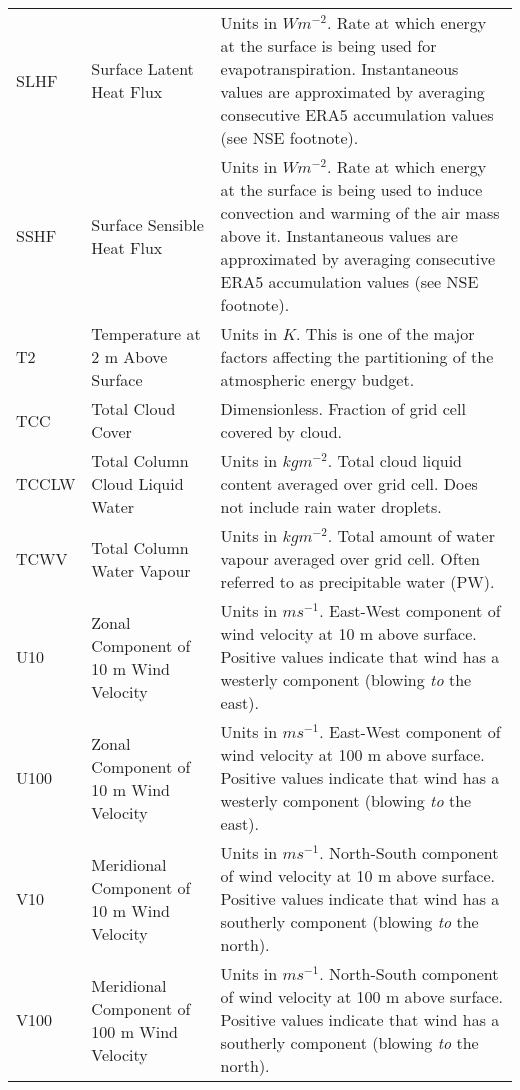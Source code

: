 \begin{landscape}
\begin{longtable}{P{2cm}P{3cm}P{13cm}}
		\acs{SLHF} & Surface Latent Heat Flux & Units in $W m^{-2}$. Rate at which energy at the surface is being used for evapotranspiration. Instantaneous values are approximated by averaging consecutive \ac{ERA5} accumulation values (see \ac{NSE} footnote). \\
		\acs{SSHF} & Surface Sensible Heat Flux & Units in $W m^{-2}$. Rate at which energy at the surface is being used to induce convection and warming of the air mass above it. Instantaneous values are approximated by averaging consecutive \ac{ERA5} accumulation values (see \ac{NSE} footnote). \\
		\acs{T2} & Temperature at 2 m Above Surface & Units in $K$. This is one of the major factors affecting the partitioning of the atmospheric energy budget. \\
		\acs{TCC} & Total Cloud Cover & Dimensionless. Fraction of grid cell covered by cloud. \\
		\acs{TCCLW} & Total Column Cloud Liquid Water & Units in $kg m^{-2}$. Total cloud liquid content averaged over grid cell. Does not include rain water droplets. \\
		\acs{TCWV} & Total Column Water Vapour & Units in $kg m^{-2}$. Total amount of water vapour averaged over grid cell. Often referred to as precipitable water (PW). \\
		\acs{U10} & Zonal Component of 10 m Wind Velocity & Units in $m s^{-1}$. East-West component of wind velocity at 10 m above surface. Positive values indicate that wind has a westerly component (blowing \textit{to} the east). \\
		\acs{U100} & Zonal Component of 10 m Wind Velocity & Units in $m s^{-1}$. East-West component of wind velocity at 100 m above surface. Positive values indicate that wind has a westerly component (blowing \textit{to} the east). \\
		\acs{V10} & Meridional Component of 10 m Wind Velocity & Units in $m s^{-1}$. North-South component of wind velocity at 10 m above surface. Positive values indicate that wind has a southerly component (blowing \textit{to} the north). \\
		\acs{V100} & Meridional Component of 100 m Wind Velocity & Units in $m s^{-1}$. North-South component of wind velocity at 100 m above surface. Positive values indicate that wind has a southerly component (blowing \textit{to} the north). \\

\end{longtable}
\end{landscape}

